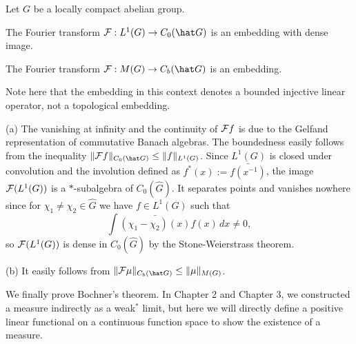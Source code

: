 \documentclass[a4paper]{article}
\begin{document}
\begin{prop}
Let $G$ be a locally compact abelian group.
\begin{parts}
\item The Fourier transform $\cF:L^1(G)\to C_0(\hat G)$ is an embedding with dense image.
\item The Fourier transform $\cF:M(G)\to C_b(\hat G)$ is an embedding.
\end{parts}
\end{prop}
\begin{pf}
Note here that the embedding in this context denotes a bounded injective linear operator, not a topological embedding.

(a)
The vanishing at infinity and the continuity of $\mathcal{F} f$ is due to the Gelfand representation of commutative Banach algebras.
The boundedness easily follows from the inequality $\|\cF f\|_{C_0(\hat G)}\le\|f\|_{L^1(G)}$.
Since $L^1(G)$ is closed under convolution and the involution defined as $f^*(x):=\bar{f(x^{-1})}$, the image $\mathcal{F}(L^1(G))$ is a $*$-subalgebra of $C_0(\hat G)$.
It separates points and vanishes nowhere since for $\chi_1\ne\chi_2\in\hat G$ we have $f\in L^1(G)$ such that
\[\int\bar{(\chi_1-\chi_2)(x)}f(x)\,dx\ne0,\]
so $\mathcal{F}(L^1(G))$ is dense in $C_0(\hat G)$ by the Stone-Weierstrass theorem.

(b)
It easily follows from $\|\cF \mu\|_{C_b(\hat G)}\le\|\mu\|_{M(G)}$.
\end{pf}

We finally prove Bochner's theorem.
In Chapter 2 and Chapter 3, we constructed a measure indirectly as a weak$^*$ limit, but here we will directly define a positive linear functional on a continuous function space to show the existence of a measure.
\end{document}
